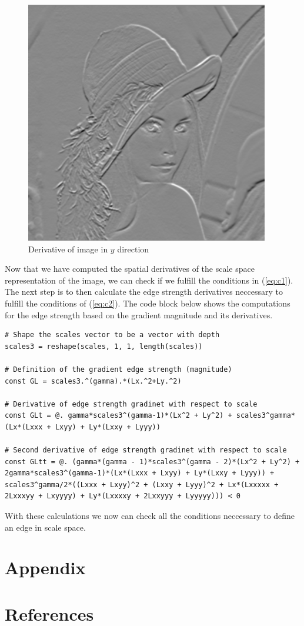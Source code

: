 \documentclass{article}
\begin{document}
\begin{figure}[H]
  \centering
  \includegraphics[scale=0.5]{Images/ly.png}
  \caption{Derivative of image in $y$ direction}
  \label{ly}
\end{figure}

Now that we have computed the spatial derivatives of the scale space representation of the image, we can check if we fulfill the conditions in (\ref{eq:c1}). 
The next step is to then calculate the edge strength derivatives neccessary to fulfill the conditions of (\ref{eq:c2}).
The code block below shows the computations for the edge strength based on the gradient magnitude and its derivatives.

\newpage

\begin{lstlisting}
# Shape the scales vector to be a vector with depth
scales3 = reshape(scales, 1, 1, length(scales))

# Definition of the gradient edge strength (magnitude)
const GL = scales3.^(gamma).*(Lx.^2+Ly.^2)

# Derivative of edge strength gradinet with respect to scale
const GLt = @. gamma*scales3^(gamma-1)*(Lx^2 + Ly^2) + scales3^gamma*(Lx*(Lxxx + Lxyy) + Ly*(Lxxy + Lyyy))

# Second derivative of edge strength gradinet with respect to scale
const GLtt = @. (gamma*(gamma - 1)*scales3^(gamma - 2)*(Lx^2 + Ly^2) + 2gamma*scales3^(gamma-1)*(Lx*(Lxxx + Lxyy) + Ly*(Lxxy + Lyyy)) + scales3^gamma/2*((Lxxx + Lxyy)^2 + (Lxxy + Lyyy)^2 + Lx*(Lxxxxx + 2Lxxxyy + Lxyyyy) + Ly*(Lxxxxy + 2Lxxyyy + Lyyyyy))) < 0
\end{lstlisting}

With these calculations we now can check all the conditions neccessary to define an edge in scale space.

\section*{Appendix}



\section*{References}
\end{document}

